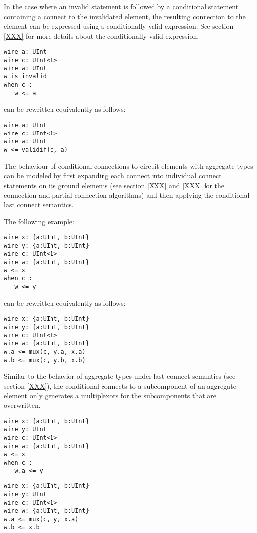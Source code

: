 \documentclass[12pt]{article}
\begin{document}
In the case where an invalid statement is followed by a conditional statement containing a connect to the invalidated element, the resulting connection to the element can be expressed using a conditionally valid expression. See section \ref{XXX} for more details about the conditionally valid expression.
\begin{verbatim}
wire a: UInt
wire c: UInt<1>
wire w: UInt
w is invalid
when c :
   w <= a
\end{verbatim}
can be rewritten equivalently as follows:
\begin{verbatim}
wire a: UInt
wire c: UInt<1>
wire w: UInt
w <= validif(c, a)
\end{verbatim}

The behaviour of conditional connections to circuit elements with aggregate types can be modeled by first expanding each connect into individual connect statements on its ground elements (see section \ref{XXX} and \ref{XXX} for the connection and partial connection algorithms) and then applying the conditional last connect semantics.

The following example:
\begin{verbatim}
wire x: {a:UInt, b:UInt}
wire y: {a:UInt, b:UInt}
wire c: UInt<1>
wire w: {a:UInt, b:UInt}
w <= x
when c :
   w <= y
\end{verbatim}
can be rewritten equivalently as follows:
\begin{verbatim}
wire x: {a:UInt, b:UInt}
wire y: {a:UInt, b:UInt}
wire c: UInt<1>
wire w: {a:UInt, b:UInt}
w.a <= mux(c, y.a, x.a)
w.b <= mux(c, y.b, x.b)
\end{verbatim}

Similar to the behavior of aggregate types under last connect semantics (see section \ref{XXX}), the conditional connects to a subcomponent of an aggregate element only generates a multiplexors for the subcomponents that are overwritten.

\begin{verbatim}
wire x: {a:UInt, b:UInt}
wire y: UInt
wire c: UInt<1>
wire w: {a:UInt, b:UInt}
w <= x
when c :
   w.a <= y
\end{verbatim}

\begin{verbatim}
wire x: {a:UInt, b:UInt}
wire y: UInt
wire c: UInt<1>
wire w: {a:UInt, b:UInt}
w.a <= mux(c, y, x.a)
w.b <= x.b
\end{verbatim}
\end{document}

